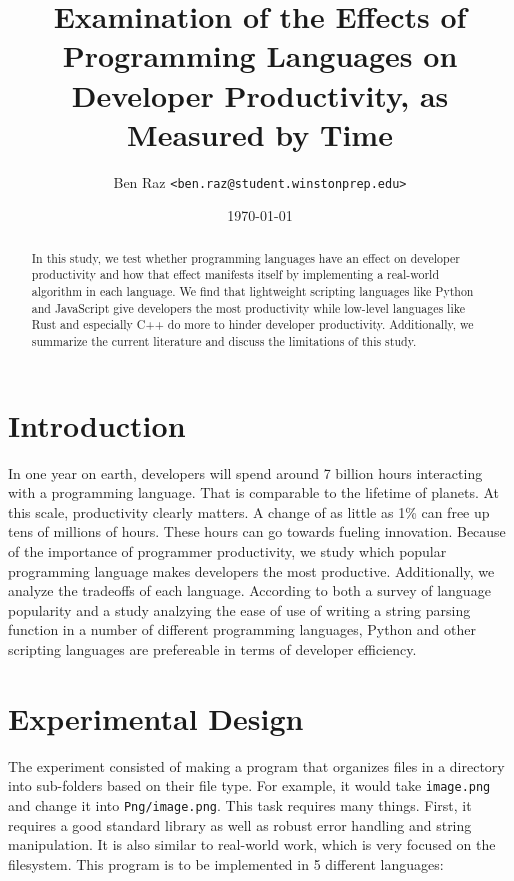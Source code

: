 \documentclass{article}
\title{\bfseries{
    Examination of the Effects of Programming Languages on Developer Productivity, as Measured by Time
}}
\author{Ben Raz \texttt{<ben.raz@student.winstonprep.edu>}}
\date{\today}
\begin{document}
\maketitle

\begin{abstract}
    In this study, we test whether programming languages have an effect on developer productivity and how that effect manifests itself by implementing a real-world algorithm in each language. We find that lightweight scripting languages like Python and JavaScript give developers the most productivity while low-level languages like Rust and especially C++ do more to hinder developer productivity. Additionally, we summarize the current literature and discuss the limitations of this study.
\end{abstract}

\section{Introduction}

In one year on earth, developers will spend around 7 billion hours\cite{softwareCodeTime} interacting with a programming language. That is comparable to the lifetime of planets. At this scale, productivity clearly matters. A change of as little as 1\% can free up tens of millions of hours. These hours can go towards fueling innovation. Because of the importance of programmer productivity, we study which popular programming language makes developers the most productive. Additionally, we analyze the tradeoffs of each language. According to both a survey of language popularity\cite{tiobe} and a study analzying the ease of use of writing a string parsing function in a number of different programming languages\cite{prechelt2000}, Python and other scripting languages are prefereable in terms of developer efficiency.

\section{Experimental Design}

The experiment consisted of making a program that organizes files in a directory into sub-folders based on their file type. For example, it would take \texttt{image.png} and change it into \texttt{Png/image.png}. This task requires many things. First, it requires a good standard library as well as robust error handling and string manipulation. It is also similar to real-world work, which is very focused on the filesystem. This program is to be implemented in 5 different languages:
\end{document}
